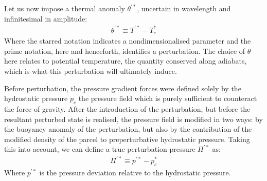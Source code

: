 \documentclass[letterpaper,10pt,english]{jupyterBook}
\begin{document}
\sphinxAtStartPar
Let us now impose a thermal anomaly \(\theta^{'*}\), uncertain in wavelength and infinitesimal in amplitude:
\begin{equation*}
\begin{split} \theta^{'*} \equiv T^{'*} - T_c^* \end{split}
\end{equation*}
\sphinxAtStartPar
Where the starred notation indicates a non\sphinxhyphen{}dimensionalised parameter and the prime notation, here and henceforth, identifies a perturbation. The choice of \(\theta\) here relates to potential temperature, the quantity conserved along adiabats, which is what this perturbation will ultimately induce.

\sphinxAtStartPar
Before perturbation, the pressure gradient forces were defined solely by the hydrostatic pressure \(p_c\) \sphinxhyphen{} the pressure field which is purely sufficient to counteract the force of gravity. After the introduction of the perturbation, but before the resultant perturbed state is realised, the pressure field is modified in two ways: by the buoyancy anomaly of the perturbation, but also by the contribution of the modified density of the parcel to pre\sphinxhyphen{}perturbative hydrostatic pressure. Taking this into account, we can define a true perturbation pressure \(\Pi^{'*}\) as:
\begin{equation*}
\begin{split} \Pi^{'*} \equiv p^{'*} - p_c^* \end{split}
\end{equation*}
\sphinxAtStartPar
Where \(p^{'*}\) is the pressure deviation relative to the hydrostatic pressure.
\end{document}
